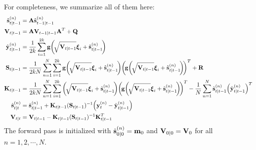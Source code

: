 		For completeness, we summarize all of them here:
		\begin{align*}
			\hat{\vec{s}}_{t \subgiven t - 1}^{(n)} &= \mat{A} \hat{\vec{s}}_{t - 1 \subgiven t - 1}^{(n)} \\
			\mat{V}_{t \subgiven t - 1} &= \mat{A} \mat{V}_{t - 1 \subgiven t - 1} \mat{A}^T + \mat{Q} \\
			\hat{\vec{y}}_{t \subgiven t - 1}^{(n)} &= \frac{1}{2k} \sum_{i = 1}^{2k} \vec{g}\bigg(\! \sqrt{\mat{V}_{t \subgiven t - 1}} \vec{\xi}_i + \hat{\vec{s}}_{t \subgiven t - 1}^{(n)} \!\bigg) \\
			\mat{S}_{t \subgiven t - 1} &= \frac{1}{2kN} \sum_{n = 1}^{N} \sum_{i = 1}^{2k} \vec{g}\bigg(\!\sqrt{\mat{V}_{t \subgiven t - 1}} \vec{\xi}_i + \hat{\vec{s}}_{t \subgiven t - 1}^{(n)}\!\bigg) \bigg(\!\vec{g}\bigg(\!\sqrt{\mat{V}_{t \subgiven t - 1}} \vec{\xi}_i + \hat{\vec{s}}_{t \subgiven t - 1}^{(n)}\!\bigg)\!\bigg)^T + \mat{R} \\
			\mat{K}_{t \subgiven t - 1} &= \frac{1}{2kN} \sum_{n = 1}^{N}  \sum_{i = 1}^{2k} \bigg(\!\sqrt{\mat{V}_{t \subgiven t - 1}} \vec{\xi}_i + \hat{\vec{s}}_{t \subgiven t - 1}^{(n)}\!\bigg) \bigg(\!\vec{g}\bigg(\!\sqrt{\mat{V}_{t \subgiven t - 1}} \vec{\xi}_i + \hat{\vec{s}}_{t \subgiven t - 1}^{(n)}\!\bigg)\!\bigg)^T - \frac{1}{N} \sum_{n = 1}^{N} \hat{\vec{s}}_{t \subgiven t - 1}^{(n)} \Big(\hat{\vec{y}}_{t \subgiven t - 1}^{(n)}\Big)^T \\
			\hat{\vec{s}}_{t \subgiven t}^{(n)} &= \hat{\vec{s}}_{t \subgiven t - 1}^{(n)} + \mat{K}_{t \subgiven t - 1} (\mat{S}_{t \subgiven t - 1})^{-1} \Big(\vec{y}_t^{(n)} - \hat{\vec{y}}_{t \subgiven t - 1}^{(n)}\Big) \\
			\mat{V}_{t \subgiven t} &= \mat{V}_{t \subgiven t - 1} - \mat{K}_{t \subgiven t - 1} (\mat{S}_{t \subgiven t - 1})^{-1} \mat{K}_{t \subgiven t - 1}^T
		\end{align*}
		The forward pass is initialized with \( \hat{\boldsymbol{\mathrm{s}}}_{0 \vert 0}^{(n)} = \boldsymbol{\mathrm{m}}_0 \) and \( \boldsymbol{\mathrm{V}}_{0 \vert 0} = \boldsymbol{\mathrm{V}}_0 \) for all \( n = 1, 2, \cdots, N \).
	
